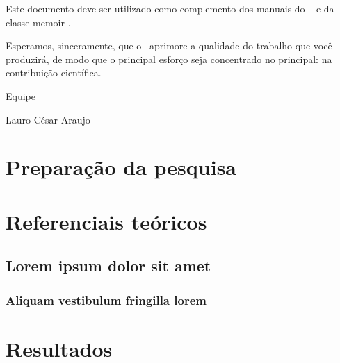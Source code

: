 \documentclass[
    12pt,               %
    openright,          %
    twoside,            %
    a4paper,            %
    english,            %
    french,             %
    spanish,            %
    brazil              %
    ]{abntex2}
\begin{document}
Este documento deve ser utilizado como complemento dos manuais do \abnTeX\ 
\cite{abntex2classe,abntex2cite,abntex2cite-alf} e da classe \textsf{memoir}
\cite{memoir}. 

Esperamos, sinceramente, que o \abnTeX\ aprimore a qualidade do trabalho que
você produzirá, de modo que o principal esforço seja concentrado no principal:
na contribuição científica.

Equipe \abnTeX 

Lauro César Araujo


\part{Preparação da pesquisa}



\part{Referenciais teóricos}

\chapter{Lorem ipsum dolor sit amet}

\section{Aliquam vestibulum fringilla lorem}

\lipsum[1]

\lipsum[2-3]

\part{Resultados}
\end{document}
